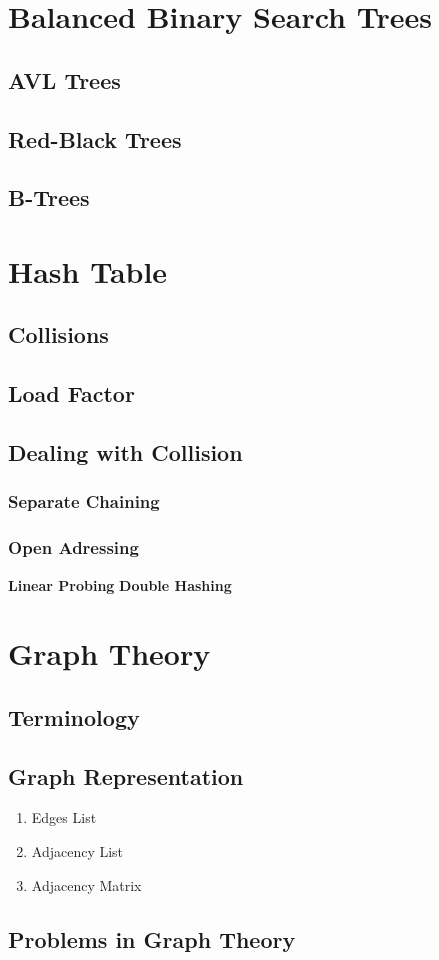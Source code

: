 \documentclass{article}
\begin{document}
\section{Balanced Binary Search Trees}

\subsection{AVL Trees}

\subsection{Red-Black Trees}

\subsection{B-Trees}

\section{Hash Table}

\subsection{Collisions}

\subsection{Load Factor}

\subsection{Dealing with Collision}

\subsubsection{Separate Chaining}
\subsubsection{Open Adressing}

\textbf{Linear Probing}
\textbf{Double Hashing}

\section{Graph Theory}

\subsection{Terminology}
\subsection{Graph Representation}

\begin{enumerate}
    \item Edges List
    \item Adjacency List
    \item Adjacency Matrix
\end{enumerate}

\subsection{Problems in Graph Theory}
\end{document}
